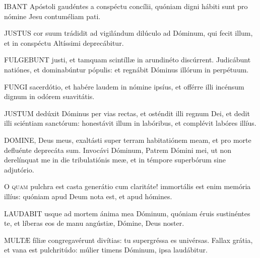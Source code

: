

\lettrine[lines=2]{I}{BANT} Apóstoli gaudéntes a conspéctu concílii, quóniam digni hábiti sunt pro nómine Jesu contuméliam pati.


\lettrine[lines=2]{J}{USTUS} cor suum trádidit ad vigilándum dilúculo ad Dóminum, qui fecit illum, et in conspéctu Altíssimi deprecábitur.


\lettrine[lines=2]{F}{ULGEBUNT} justi, et tamquam scintíllæ in arundinéto discúrrent. Judicábunt natiónes, et dominabúntur pópulis: et regnábit Dóminus illórum in perpétuum.


\lettrine[lines=2]{F}{UNGI} sacerdótio, et habére laudem in nómine ipsíus, et offérre illi incénsum dignum in odórem suavitátis.


\lettrine[lines=2]{J}{USTUM} dedúxit Dóminus per vias rectas, et osténdit illi regnum Dei, et dedit illi sciéntiam sanctórum: honestávit illum in labóribus, et complévit labóres illíus.


\lettrine[lines=2]{D}{OMINE}, Deus meus, exaltásti super terram habitatiónem meam, et pro morte defluénte deprecáta sum. Invocávi Dóminum, Patrem Dómini mei, ut non derelínquat me in die tribulatiónis meæ, et in témpore superbórum sine adjutório.


\lettrine[lines=2]{O}{} \textsc{quam} pulchra est casta generátio cum claritáte! immortális est enim memória illíus: quóniam apud Deum nota est, et apud hómines.


\lettrine[lines=2]{L}{AUDABIT} usque ad mortem ánima mea Dóminum, quóniam éruis sustinéntes te, et líberas eos de manu angústiæ, Dómine, Deus noster.


\lettrine[lines=2]{M}{ULTÆ} fíliæ congregavérunt divítias: tu supergréssa es univérsas. Fallax grátia, et vana est pulchritúdo: múlier timens Dóminum, ipsa laudábitur.

